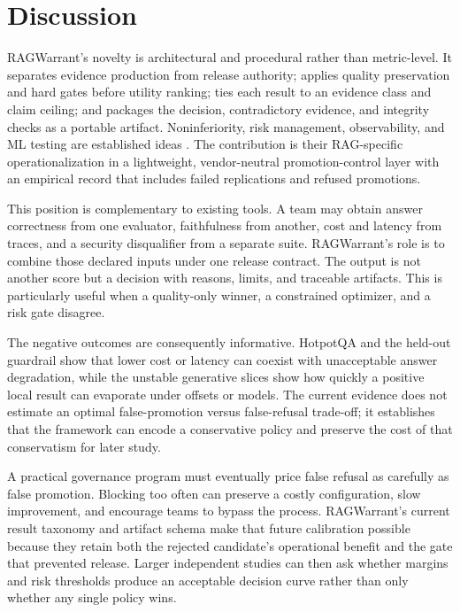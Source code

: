 \documentclass[11pt]{article}
\begin{document}
\section{Discussion}
RAGWarrant's novelty is architectural and procedural rather than metric-level. It separates evidence production from release authority; applies quality preservation and hard gates before utility ranking; ties each result to an evidence class and claim ceiling; and packages the decision, contradictory evidence, and integrity checks as a portable artifact. Noninferiority, risk management, observability, and ML testing are established ideas \cite{ref11,ref12,ref13,ref14,ref15,ref16,ref17}. The contribution is their RAG-specific operationalization in a lightweight, vendor-neutral promotion-control layer with an empirical record that includes failed replications and refused promotions.

This position is complementary to existing tools. A team may obtain answer correctness from one evaluator, faithfulness from another, cost and latency from traces, and a security disqualifier from a separate suite. RAGWarrant's role is to combine those declared inputs under one release contract. The output is not another score but a decision with reasons, limits, and traceable artifacts. This is particularly useful when a quality-only winner, a constrained optimizer, and a risk gate disagree.

The negative outcomes are consequently informative. HotpotQA and the held-out guardrail show that lower cost or latency can coexist with unacceptable answer degradation, while the unstable generative slices show how quickly a positive local result can evaporate under offsets or models. The current evidence does not estimate an optimal false-promotion versus false-refusal trade-off; it establishes that the framework can encode a conservative policy and preserve the cost of that conservatism for later study.

A practical governance program must eventually price false refusal as carefully as false promotion. Blocking too often can preserve a costly configuration, slow improvement, and encourage teams to bypass the process. RAGWarrant's current result taxonomy and artifact schema make that future calibration possible because they retain both the rejected candidate's operational benefit and the gate that prevented release. Larger independent studies can then ask whether margins and risk thresholds produce an acceptable decision curve rather than only whether any single policy wins.
\end{document}
